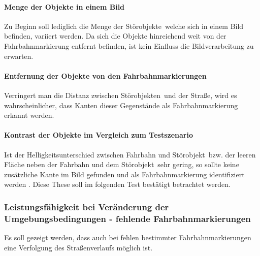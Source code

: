 \paragraph{Menge der Objekte in einem Bild}
Zu Beginn soll lediglich die Menge der \glqq Störobjekte\grqq\, welche sich in einem Bild befinden, variiert werden. Da sich die Objekte hinreichend weit von der Fahrbahnmarkierung entfernt befinden, ist kein Einfluss die Bildverarbeitung zu erwarten.

\paragraph{Entfernung der Objekte von den Fahrbahnmarkierungen}
Verringert man die Distanz zwischen \glqq Störobjekten\grqq\ und der Straße, wird es wahrscheinlicher, dass Kanten dieser Gegenstände als Fahrbahnmarkierung erkannt werden.

\paragraph{Kontrast der Objekte im Vergleich zum Testszenario}
Ist der Helligkeitsunterschied zwischen Fahrbahn und \glqq Störobjekt\grqq\ bzw. der leeren Fläche neben der Fahrbahn und dem \glqq Störobjekt\grqq\ sehr gering, so sollte keine zusätzliche Kante im Bild gefunden und als Fahrbahnmarkierung identifiziert werden . Diese These soll im folgenden Test bestätigt betrachtet werden.

\subsubsection{Leistungsfähigkeit bei Veränderung der Umgebungsbedingungen - fehlende Fahrbahnmarkierungen}
Es soll gezeigt werden, dass auch bei fehlen bestimmter Fahrbahnmarkierungen eine Verfolgung des Straßenverlaufs möglich ist.






